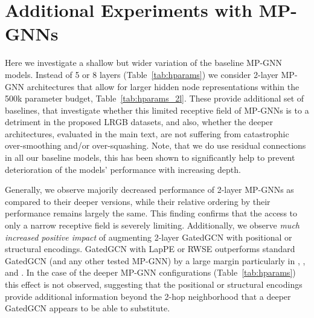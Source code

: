 \documentclass{article}
\begin{document}
\section{Additional Experiments with \texorpdfstring{}{L=2} MP-GNNs} \label{app:2layer-mpnns}
\setcounter{figure}{0}
\setcounter{table}{0}


Here we investigate a shallow but wider variation of the baseline MP-GNN models. Instead of 5 or 8 layers (Table~\ref{tab:hparams}) we consider 2-layer MP-GNN architectures that allow for larger hidden node representations within the 500k parameter budget, Table~\ref{tab:hparams_2l}. These provide additional set of baselines, that investigate whether this limited receptive field of MP-GNNs is to a detriment in the proposed LRGB datasets, and also, whether the deeper architectures, evaluated in the main text, are not suffering from catastrophic over-smoothing and/or over-squashing. Note, that we do use residual connections in all our baseline models, this has been shown to significantly help to prevent deterioration of the models' performance with increasing depth.

Generally, we observe majorily decreased performance of 2-layer MP-GNNs as compared to their deeper versions, while their relative ordering by their performance remains largely the same. This finding confirms that the access to only a narrow receptive field is severely limiting. Additionally, we observe \emph{much increased positive impact} of augmenting 2-layer GatedGCN with positional or structural encodings. GatedGCN with LapPE or RWSE outperforms standard GatedGCN (and any other tested MP-GNN) by a large margin particularly in \pcqmcontact, \pepfunc, and \pepstruct. In the case of the deeper MP-GNN configurations (Table~\ref{tab:hparams}) this effect is not observed, suggesting that the positional or structural encodings provide additional information beyond the 2-hop neighborhood that a deeper GatedGCN appears to be able to substitute.
\end{document}
